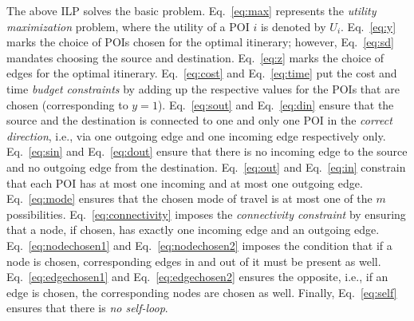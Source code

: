 The above ILP solves the basic \trip problem.  Eq.~\eqref{eq:max}
represents the \emph{utility maximization} problem, where the
utility of a POI $i$ is denoted by $U_i$.  Eq.~\eqref{eq:y} marks
the choice of POIs chosen for the optimal itinerary; however,
Eq.~\eqref{eq:sd} mandates choosing the source and destination.
Eq.~\eqref{eq:z} marks the choice of edges for the optimal
itinerary.  Eq.~\eqref{eq:cost} and Eq.~\eqref{eq:time} put the
cost and time \emph{budget constraints} by adding up the
respective values for the POIs that are chosen (corresponding to
$y = 1$).  Eq.~\eqref{eq:sout} and Eq.~\eqref{eq:din} ensure that
the source and the destination is connected to one and only one
POI in the \emph{correct direction}, i.e., via one outgoing edge
and one incoming edge respectively only.  Eq.~\eqref{eq:sin} and
Eq.~\eqref{eq:dout} ensure that there is no incoming edge to the
source and no outgoing edge from the destination.
Eq.~\eqref{eq:out} and Eq.~\eqref{eq:in} constrain that each POI
has at most one incoming and at most one outgoing edge.
Eq.~\eqref{eq:mode} ensures that the chosen mode of travel is at
most one of the $m$ possibilities.  Eq.~\eqref{eq:connectivity}
imposes the \emph{connectivity constraint} by ensuring that a
node, if chosen, has exactly one incoming edge and an outgoing
edge.  Eq.~\eqref{eq:nodechosen1} and Eq.~\eqref{eq:nodechosen2}
imposes the condition that if a node is chosen, corresponding
edges in and out of it must be present as well.
Eq.~\eqref{eq:edgechosen1} and Eq.~\eqref{eq:edgechosen2} ensures
the opposite, i.e., if an edge is chosen, the corresponding nodes
are chosen as well.  Finally, Eq.~\eqref{eq:self} ensures that
there is \emph{no self-loop}.

